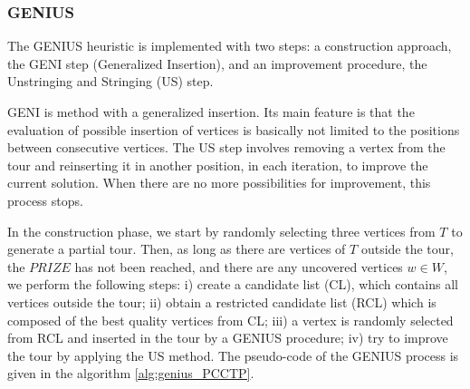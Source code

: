 \documentclass{singlecol-new}
\begin{document}




\subsubsection{GENIUS}

The GENIUS heuristic \citep{genius} is implemented with  two steps: a construction approach, the GENI step (Generalized Insertion), and an improvement procedure, the Unstringing and Stringing (US) step. 

GENI is method with a generalized insertion. Its main feature is that the evaluation of possible insertion of vertices is basically not limited to the positions between consecutive vertices.
The US step involves removing a vertex from the tour and reinserting it in another position, in each iteration, to improve the current solution. When there are no more possibilities for improvement, this process stops.


In the construction phase, we start by randomly selecting three vertices from $T$ to generate a partial tour. Then, as long as there are vertices of $T$ outside the tour, the $PRIZE$ has not been reached, and there are any uncovered vertices $w \in W $, we  perform the following steps: i) create a candidate list (CL), which contains all vertices outside the tour; ii) obtain a restricted candidate list (RCL) which is composed of the best quality vertices from CL; iii) a vertex is randomly selected from RCL and inserted in the tour by a GENIUS procedure; iv) try to improve the tour by applying the US method. The pseudo-code of the GENIUS process is given in the algorithm \ref{alg:genius_PCCTP}.
\end{document}
